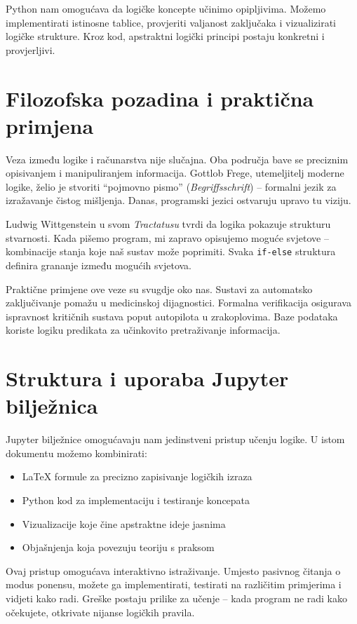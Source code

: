 Python nam omogućava da logičke koncepte učinimo opipljivima. Možemo implementirati istinosne tablice, provjeriti valjanost zaključaka i vizualizirati logičke strukture. Kroz kod, apstraktni logički principi postaju konkretni i provjerljivi.

\section*{Filozofska pozadina i praktična primjena}

Veza između logike i računarstva nije slučajna. Oba područja bave se preciznim opisivanjem i manipuliranjem informacija. Gottlob Frege, utemeljitelj moderne logike, želio je stvoriti ``pojmovno pismo'' (\textit{Begriffsschrift}) -- formalni jezik za izražavanje čistog mišljenja. Danas, programski jezici ostvaruju upravo tu viziju.

Ludwig Wittgenstein u svom \textit{Tractatusu} tvrdi da logika pokazuje strukturu stvarnosti. Kada pišemo program, mi zapravo opisujemo moguće svjetove -- kombinacije stanja koje naš sustav može poprimiti. Svaka \texttt{if-else} struktura definira grananje između mogućih svjetova.

Praktične primjene ove veze su svugdje oko nas. Sustavi za automatsko zaključivanje pomažu u medicinskoj dijagnostici. Formalna verifikacija osigurava ispravnost kritičnih sustava poput autopilota u zrakoplovima. Baze podataka koriste logiku predikata za učinkovito pretraživanje informacija.

\section*{Struktura i uporaba Jupyter bilježnica}

Jupyter bilježnice omogućavaju nam jedinstveni pristup učenju logike. U istom dokumentu možemo kombinirati:
\begin{itemize}
\item LaTeX formule za precizno zapisivanje logičkih izraza
\item Python kod za implementaciju i testiranje koncepata
\item Vizualizacije koje čine apstraktne ideje jasnima
\item Objašnjenja koja povezuju teoriju s praksom
\end{itemize}

Ovaj pristup omogućava interaktivno istraživanje. Umjesto pasivnog čitanja o modus ponensu, možete ga implementirati, testirati na različitim primjerima i vidjeti kako radi. Greške postaju prilike za učenje -- kada program ne radi kako očekujete, otkrivate nijanse logičkih pravila.

